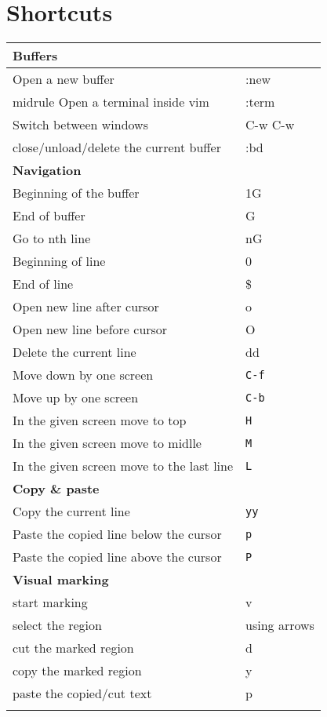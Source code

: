 \documentclass{article}
\begin{document}
\section{Shortcuts}
\label{sec:shortcuts}

\begin{longtable}{ll}
\toprule
{\bfseries Buffers} & \\ \midrule
Open a new buffer & :new \\midrule
Open a terminal inside vim & :term \\ \midrule
Switch between windows & C-w C-w \\ \midrule
close/unload/delete the current buffer & :bd \\ \midrule
{\bfseries Navigation} & \\ \midrule
Beginning of the buffer & 1G \\ \midrule
End of buffer & G \\ \midrule
Go to nth line & nG\\ \midrule
Beginning of line & 0\\ \midrule
End of line & \$\\ \midrule
Open new line after cursor & o \\ \midrule
Open new line before cursor & O \\ \midrule
Delete the current line & dd \\  \midrule
Move down by one screen & \verb!C-f!\\ \midrule
Move up by one screen & \verb!C-b!\\ \midrule
In the given screen move to top & \verb!H!\\ \midrule
In the given screen move to midlle & \verb!M!\\ \midrule
In the given screen move to the last line & \verb!L!\\ \midrule
{\bfseries Copy \& paste} & \\ \midrule
Copy the current line & \verb!yy!\\ \midrule
Paste the copied line below the cursor & \verb!p!\\ \midrule
Paste the copied line above the cursor & \verb!P!\\ \midrule
{\bfseries Visual marking} & \\ \midrule
start marking & v \\ \midrule
select the region & using arrows\\ \midrule
cut the marked region & d \\ \midrule
copy the marked region & y \\ \midrule
paste the copied/cut text & p \\ \midrule
                          & \\ \bottomrule
\end{longtable}
\end{document}
